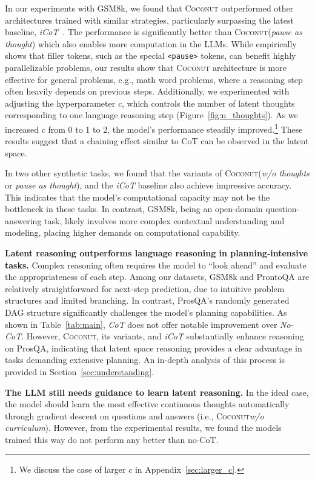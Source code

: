 \documentclass[]{fairmeta}
\newcommand{\ours}{\textsc{Coconut}\xspace}
\begin{document}
In our experiments with GSM8k, we found that \ours outperformed other architectures trained with similar strategies, particularly surpassing the latest baseline, \textit{iCoT}~\citep{deng2024explicit}. The performance is significantly better than \ours (\textit{pause as thought}) which also enables more computation in the LLMs.  While \cite{pfau2024let} empirically shows that filler tokens, such as the special \texttt{<pause>} tokens, can benefit highly parallelizable problems, our results show that \ours architecture is more effective for general problems, e.g., math word problems, where a reasoning step often heavily depends on previous steps. Additionally, we experimented with adjusting the hyperparameter $c$, which controls the number of latent thoughts corresponding to one language reasoning step (Figure~\ref{fig:n_thoughts}). As we increased $c$ from 0 to 1 to 2, the model’s performance steadily improved.\footnote{We discuss the case of larger $c$ in Appendix~\ref{sec:larger_c}.} These results suggest that a chaining effect similar to CoT can be observed in the latent space.

In two other synthetic tasks, we found that the variants of \ours (\textit{w/o thoughts} or \textit{pause as thought}), and the \textit{iCoT} baseline also achieve impressive accuracy. This indicates that the model’s computational capacity may not be the bottleneck in these tasks. In contrast, GSM8k, being an open-domain question-answering task, likely involves more complex contextual understanding and modeling, placing higher demands on computational capability. 

\noindent \textbf{Latent reasoning outperforms language reasoning in planning-intensive tasks.} 
Complex reasoning often requires the model to ``look ahead'' and evaluate the appropriateness of each step. Among our datasets, GSM8k and ProntoQA are relatively straightforward for next-step prediction, due to intuitive problem structures and limited branching. In contrast, ProsQA’s randomly generated DAG structure significantly challenges the model’s planning capabilities. As shown in Table~\ref{tab:main}, \textit{CoT} does not offer notable improvement over \textit{No-CoT}. However, \ours, its variants, and \textit{iCoT} substantially enhance reasoning on ProsQA, indicating that latent space reasoning provides a clear advantage in tasks demanding extensive planning. An in-depth analysis of this process is provided in Section~\ref{sec:understanding}.


\noindent \textbf{The LLM still needs guidance to learn latent reasoning.} 
In the ideal case, the model should learn the most effective continuous thoughts automatically through gradient descent on questions and answers (i.e., \ours \textit{w/o curriculum}). However, from the experimental results, we found  the models trained this way do not perform any better than no-CoT.
\end{document}

